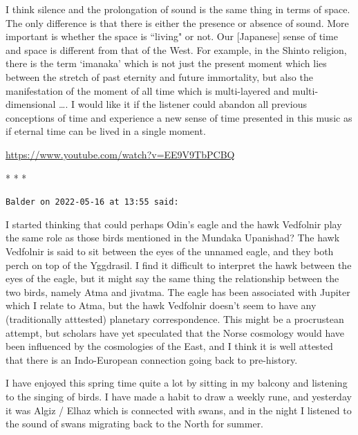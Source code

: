 \hfill

\begin{quotex}
I think silence and the prolongation of sound is the same thing in terms of space. The only difference is that there is either the presence or absence of sound. More important is whether the space is ``living" or not. Our [Japanese] sense of time and space is different from that of the West. For example, in the Shinto religion, there is the term `imanaka' which is not just the present moment which lies between the stretch of past eternity and future immortality, but also the manifestation of the moment of all time which is multi-layered and multi-dimensional …. I would like it if the listener could abandon all previous conceptions of time and experience a new sense of time presented in this music as if eternal time can be lived in a single moment. 

\end{quotex}

\url{https://www.youtube.com/watch?v=EE9V9TbPCBQ}



\begin{center}* * *\end{center}

\begin{footnotesize}\begin{sffamily}



\texttt{Balder on 2022-05-16 at 13:55 said: }

I started thinking that could perhaps Odin's eagle and the hawk Vedfolnir play the same role as those birds mentioned in the Mundaka Upanishad? The hawk Vedfolnir is said to sit between the eyes of the unnamed eagle, and they both perch on top of the Yggdrasil. I find it difficult to interpret the hawk between the eyes of the eagle, but it might say the same thing the relationship between the two birds, namely Atma and jivatma. The eagle has been associated with Jupiter which I relate to Atma, but the hawk Vedfolnir doesn't seem to have any (traditionally atttested) planetary correspondence. This might be a procrustean attempt, but scholars have yet speculated that the Norse cosmology would have been influenced by the cosmologies of the East, and I think it is well attested that there is an Indo-European connection going back to pre-history.

I have enjoyed this spring time quite a lot by sitting in my balcony and listening to the singing of birds. I have made a habit to draw a weekly rune, and yesterday it was Algiz / Elhaz which is connected with swans, and in the night I listened to the sound of swans migrating back to the North for summer.


\end{sffamily}\end{footnotesize}
